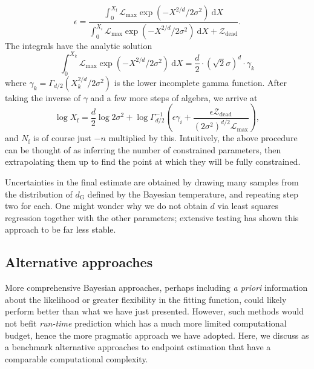 \documentclass[usenatbib]{mnras}
\newcommand{\Like}{\mathcal{L}}
\begin{document}
\begin{equation}
	\epsilon = \frac{\int_0^{X_\mathrm{f}} \Like_\mathrm{max} \exp\left(-X^{2/d}/2\sigma^2\right)\ \mathrm{d}X}{\int_0^{X_i} \Like_\mathrm{max} \exp\left(-X^{2/d}/2\sigma^2\right)\ \mathrm{d}X + \mathcal{Z}_\mathrm{dead}}.
\end{equation}
The integrals have the analytic solution
\begin{equation}
	\int_0^{X_k} \Like_\mathrm{max} \exp\left(-X^{2/d}/2\sigma^2\right)\ \mathrm{d}X = \frac{d}{2} \cdot \left(\sqrt{2}\sigma\right)^d \cdot \gamma_k
\end{equation}
where $\gamma_k = \Gamma_{d/2}\left(X_k^{2/d}/2\sigma^2\right)$ is the lower incomplete gamma function. After taking the inverse of  $\gamma$ and a few more steps of algebra, we arrive at
\begin{equation}
    \log X_\mathrm{f} = \frac{d}{2}\log 2\sigma^2	+ \log \Gamma^{-1}_{d/2} \left(\epsilon \gamma_i+ \frac{\epsilon\mathcal{Z}_\mathrm{dead}}{ \left( 2\sigma^2 \right)^{d/2}\Like_\mathrm{max}}\right),\label{eq:xf}
\end{equation}
and $N_\mathrm{f}$ is of course just $-n$ multiplied by this. Intuitively, the above procedure can be thought of as inferring the number of constrained parameters, then extrapolating them up to find the point at which they will be fully constrained. 
\par
Uncertainties in the final estimate are obtained by drawing many samples from the distribution of $d_\mathrm{G}$ defined by the Bayesian temperature, and repeating step two for each. One might wonder why we do not obtain $d$ via least squares regression together with the other parameters; extensive testing has shown this approach to be far less stable. 

\subsection{Alternative approaches}
More comprehensive Bayesian approaches, perhaps including \textit{a priori} information about the likelihood or greater flexibility in the fitting function, could likely perform better than what we have just presented. However, such methods would not befit \textit{run-time} prediction which has a much more limited computational budget, hence the more pragmatic approach we have adopted. Here, we discuss as a benchmark alternative approaches to endpoint estimation that have a comparable computational complexity. 
\end{document}
